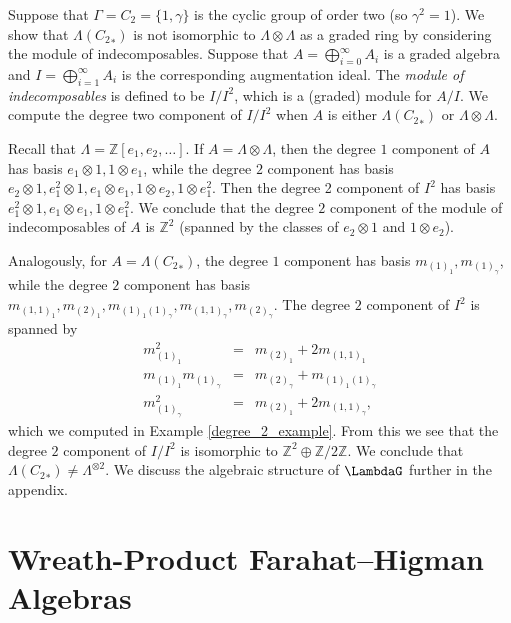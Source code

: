\begin{example}
Suppose that $\Gamma = C_2 = \{1, \gamma\}$ is the cyclic group of order two (so $\gamma^2=1$). We show that $\Lambda({C_2}_*)$ is not isomorphic to $\Lambda \otimes \Lambda$ as a graded ring by considering the module of indecomposables. Suppose that $A = \bigoplus_{i=0}^\infty A_i$ is a graded algebra and $I = \bigoplus_{i=1}^\infty A_i$ is the corresponding augmentation ideal. The \emph{module of indecomposables} is defined to be $I/I^2$, which is a (graded) module for $A/I$. We compute the degree two component of $I/I^2$ when $A$ is either $\Lambda({C_2}_*)$ or $\Lambda \otimes \Lambda$.

Recall that $\Lambda = \mathbb{Z}[e_1, e_2, \ldots]$. If $A = \Lambda \otimes \Lambda$, then the degree $1$ component of $A$ has basis $e_1 \otimes 1, 1 \otimes e_1$, while the degree $2$ component has basis $e_2 \otimes 1, e_1^2 \otimes 1, e_1 \otimes e_1, 1 \otimes e_2, 1 \otimes e_1^2$. Then the degree 2 component of $I^2$ has basis $e_1^2 \otimes 1, e_1 \otimes e_1, 1 \otimes e_1^2$. We conclude that the degree $2$ component of the module of indecomposables of $A$ is $\mathbb{Z}^2$ (spanned by the classes of $e_2 \otimes 1$ and $1 \otimes e_2$).

Analogously, for $A = \Lambda({C_2}_*)$, the degree $1$ component has basis $m_{(1)_1}, m_{(1)_\gamma}$, while the degree $2$ component has basis $m_{(1,1)_1}, m_{(2)_1}, m_{(1)_1 (1)_\gamma}, m_{(1,1)_\gamma}, m_{(2)_\gamma}$. The degree $2$ component of $I^2$ is spanned by 
\begin{eqnarray*}
m_{(1)_1}^2 &=& m_{(2)_1} + 2m_{(1,1)_1} \\
m_{(1)_1}m_{(1)_\gamma} &=&  m_{(2)_\gamma} + m_{(1)_1 (1)_\gamma} \\
m_{(1)_\gamma}^2 &=& m_{(2)_1} + 2 m_{(1,1)_\gamma},
\end{eqnarray*}
which we computed in Example \ref{degree_2_example}. From this we see that the degree $2$ component of $I/I^2$ is isomorphic to $\mathbb{Z}^{2} \oplus \mathbb{Z}/2\mathbb{Z}$. We conclude that $\Lambda({C_2}_*) \neq \Lambda^{\otimes 2}$. We discuss the algebraic structure of $\LambdaG$ further in the appendix.
\end{example}



\section{Wreath-Product Farahat--Higman Algebras} \label{rgamma_section}

